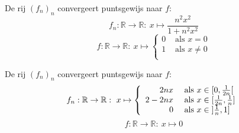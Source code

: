 \documentclass[main.tex]{subfiles}
\begin{document}
\begin{vb}
  De rij $(f_{n})_{n}$ convergeert puntsgewijs naar $f$:
  \[
  f_{n}: \mathbb{R} \rightarrow \mathbb{R}:\ x \mapsto \frac{n^{2}x^{2}}{1 + n^{2}x^{2}}
  \]
  \[
  f: \mathbb{R} \rightarrow \mathbb{R}:\ x \mapsto
  \left\{
    \begin{array}{rl}
      0  & \text{ als } x = 0\\
      1  & \text{ als } x \neq 0\\
    \end{array}
  \right.
  \]
\end{vb}

\begin{vb}
  De rij $(f_{n})_{n}$ convergeert puntsgewijs naar $f$:
  \[
  f_{n}: \mathbb{R} \rightarrow \mathbb{R}:\ x \mapsto
  \left\{
    \begin{array}{rl}
      2nx   & \text{ als } x \in \interval[open right]{0}{\frac{1}{2n}}\\
      2-2nx & \text{ als } x \in \interval{\frac{1}{2n}}{\frac{1}{n}}\\
      0     & \text{ als } x \in \interval[open left ]{\frac{1}{n}}{1}\\
    \end{array}
  \right.
  \]
  \[ f: \mathbb{R} \rightarrow \mathbb{R}:\ x \mapsto 0 \]
\end{vb}
\end{document}
